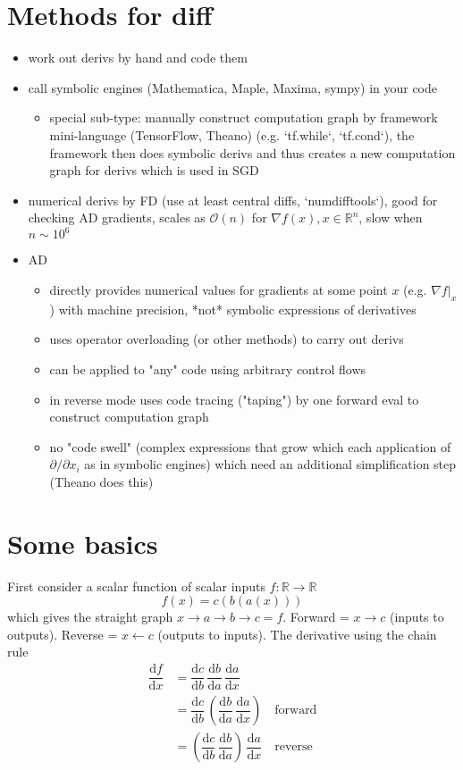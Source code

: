 \documentclass[paper=a4,11pt,headsepline]{scrartcl}
\newcommand{\ve}[1]{\ensuremath{\bm{\mathit{#1}}}}
\newcommand{\dd}{\text{d}}
\newcommand{\ra}{\ensuremath{\rightarrow}}
\newcommand{\la}{\ensuremath{\leftarrow}}
\newcommand{\td}[2]{\dfrac{\dd #1}{\dd #2}}
\begin{document}
\section*{Methods for diff}

\begin{itemize}
    \item work out derivs by hand and code them
    \item call symbolic engines (Mathematica, Maple, Maxima, sympy) in your code
    \begin{itemize}
        \item special sub-type: manually construct computation graph by
            framework mini-language (TensorFlow, Theano) (e.g. `tf.while`,
            `tf.cond`), the framework then does symbolic derivs and thus
            creates a new computation graph for derivs which is used in SGD
    \end{itemize}
\item numerical derivs by FD (use at least central diffs, `numdifftools`), good
    for checking AD gradients, scales as $\mathcal O(n)$ for $\nabla f(\ve x),
    \ve x\in\mathbb R^n$, slow when $n\sim 10^6$
\item AD
    \begin{itemize}
        \item directly provides numerical values for gradients at some point
            $\ve x$ (e.g. $\nabla f|_{\ve x}$) with machine precision, *not*
            symbolic expressions of derivatives
        \item uses operator overloading (or other methods) to carry out derivs
        \item can be applied to "any" code using arbitrary control flows
        \item in reverse mode uses code tracing ("taping") by one forward eval
            to construct computation graph
        \item no "code swell" (complex expressions that grow which each
            application of $\partial/\partial x_i$ as in symbolic engines)
            which need an additional simplification step (Theano does this)
    \end{itemize}
\end{itemize}
%
\section*{Some basics}
First consider a scalar function of scalar inputs $f:\mathbb R\ra\mathbb R$
\begin{equation*}
    f(x) = c(b(a(x)))
\end{equation*}
which gives the straight graph $x\ra a\ra b\ra c = f$. Forward = $x \ra c$ (inputs
to outputs). Reverse = $x \la c$ (outputs to inputs).
The derivative using the chain rule
\begin{align*}
    \td{f}{x}
        &= \td{c}{b}\,\td{b}{a}\,\td{a}{x}\\
        &= \td{c}{b}\,\left(\td{b}{a}\,\td{a}{x}\right)\quad\text{forward}\\
        &= \left(\td{c}{b}\,\td{b}{a}\right)\,\td{a}{x}\quad\text{reverse}\\
\end{align*}
\end{document}
